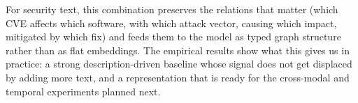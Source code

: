 \documentclass[11pt]{article}
\begin{document}
For security text, this combination preserves the relations that
matter (which CVE affects which software, with which attack vector,
causing which impact, mitigated by which fix) and feeds them to the
model as typed graph structure rather than as flat embeddings. The
empirical results show what this gives us in practice: a strong
description-driven baseline whose signal does not get displaced by
adding more text, and a representation that is ready for the
cross-modal and temporal experiments planned next.
\end{document}
